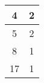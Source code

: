 \begin{table}[H]
\begin{tabular}{cc}
\multicolumn{1}{|c|}{4}                                                        & \multicolumn{1}{c|}{2}                                                             \\ \hline
\multicolumn{1}{|c|}{5}                                                        & \multicolumn{1}{c|}{2}                                                             \\ \hline
\multicolumn{1}{|c|}{8}                                                        & \multicolumn{1}{c|}{1}                                                             \\ \hline
\multicolumn{1}{|c|}{17}                                                        & \multicolumn{1}{c|}{1}                                                             \\ \hline
\end{tabular}\end{table}